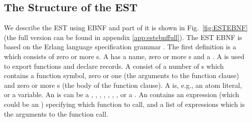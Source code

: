 \subsection{The Structure of the EST}
We describe the EST using EBNF and part of it is shown in Fig.~\ref{fig:ESTEBNF} (the full version can be found in appendix \ref{app:estebnffull}). The EST EBNF is based on the Erlang language specification grammar \cite{RefWorks:91}. The first definition is a  which consists of zero or more s. A  has a name, zero or more s and a . A  is used to export functions and declare records. A  consist of a number of s which contains a function symbol, zero or one  (the arguments to the function clause) and zero or more s (the body of the function clause). A  is, e.g., an atom literal, or a variable. An  is can be a , , , , , , , or a . An  contains an expression (which could be an ) specifying which function to call, and a list of expressions which is the arguments to the function call.

